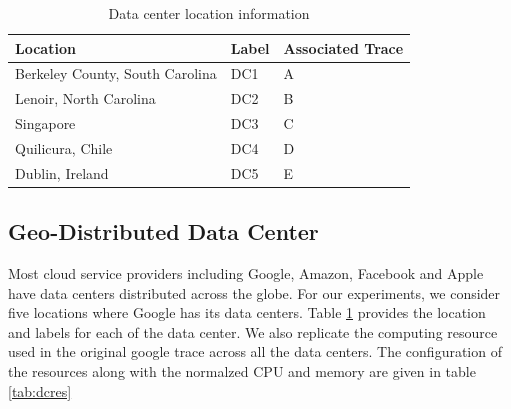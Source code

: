 \documentclass[letterpaper,twocolumn,10pt]{article}
\begin{document}
\begin{table}[] 
 \centering
\begin{tabular}{|p{3cm}|l|p{2.5cm}|}
\hline
\bf{Location}                        & \bf{Label} & \bf{Associated Trace} \\ \hline
Berkeley County, South Carolina & DC1   & A                \\ \hline
Lenoir, North Carolina          & DC2   & B                \\ \hline
Singapore                       & DC3   & C                \\ \hline
Quilicura, Chile                & DC4   & D                \\ \hline
Dublin, Ireland                 & DC5   &   E               \\ \hline
\end{tabular}
\caption {Data center location information} \label{tab:dc}
\end{table}

\subsection{Geo-Distributed Data Center}
Most cloud service providers including Google, Amazon, Facebook and Apple have data centers distributed across the globe. For our experiments, we consider five locations where Google has its data centers\cite{googletracedata}. Table \ref{tab:dc} provides the location and labels for each of the data center. We also replicate the computing resource used in the original google trace across all the data centers. The configuration of the resources along with the normalzed CPU and memory are given in table \ref{tab:dcres}

\begin{table}[] 
 \centering
{}
\caption {Data center IT resource configuration} \label{tab:dcres}
\end{table}
\end{document}
